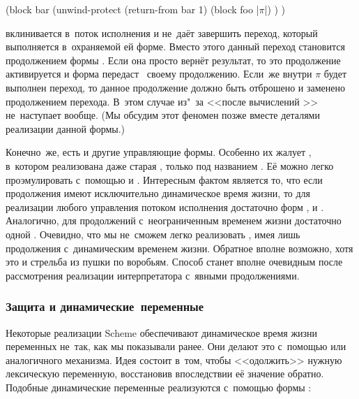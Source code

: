 \begin{code:lisp}
(block bar
  (unwind-protect (return-from bar 1)
    (block foo |$\pi$|) ) )
\end{code:lisp}

 вклинивается в~поток исполнения и не~даёт завершить переход,
который выполняется в~охраняемой ей форме. Вместо этого данный переход
становится продолжением формы . Если она просто вернёт
результат, то это продолжение активируется и форма 
передаст~ своему продолжению. Если~же внутри $\pi$ будет выполнен переход,
то данное продолжение должно быть отброшено и заменено продолжением перехода.
В~этом случае из"~за  <<после вычислений >> не~наступает вообще. (Мы обсудим этот феномен позже вместе деталями
реализации данной формы.)

\bigskip

Конечно~же, есть и другие управляющие формы. Особенно их жалует {\CommonLisp},
в~котором реализована даже старая , только под названием .
Её можно легко проэмулировать с~помощью  и .
 Интересным фактом является то, что если продолжения
имеют исключительно динамическое время жизни, то для реализации любого
управления потоком исполнения достаточно форм ,  и
. Аналогично, для продолжений с~неограниченным временем жизни
достаточно одной . Очевидно, что мы не~сможем легко реализовать
, имея лишь продолжения с~динамическим временем жизни. Обратное
вполне возможно, хотя это и стрельба из пушки по воробьям. Способ станет вполне
очевидным после рассмотрения реализации интерпретатора с~явными продолжениями.


\subsubsection{Защита и динамические~переменные}

Некоторые реализации Scheme обеспечивают динамическое время жизни переменных
не~так, как мы показывали ранее. Они делают это с~помощью 
или аналогичного механизма. Идея состоит в~том, чтобы <<одолжить>> нужную
лексическую переменную, восстановив впоследствии её значение обратно. Подобные
динамические переменные реализуются с~помощью формы :

